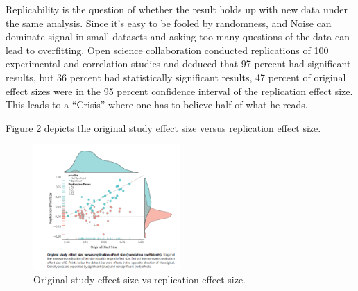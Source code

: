 Replicability is the question of whether the result holds up with new data under the same analysis. Since it's easy to be fooled by randomness, and Noise can dominate signal in small datasets and asking too many questions of the data can lead to overfitting.
Open science collaboration conducted replications of 100 experimental and correlation studies and deduced that 97 percent  had significant results, but 36 percent had statistically significant results, 47 percent of original effect sizes were in the 95 percent confidence interval of the replication effect size. This leads to a “Crisis” where one has to believe half of what he reads.

Figure 2 depicts the original study effect size versus replication effect size. 

\begin{figure}[ht]
  \begin{center}
    \includegraphics[width=0.5\textwidth]{figures/Crisis.png}
    \caption{
    Original study effect size vs replication effect size.
      }
    \label{fig:badges}
  \end{center}
\end{figure}

